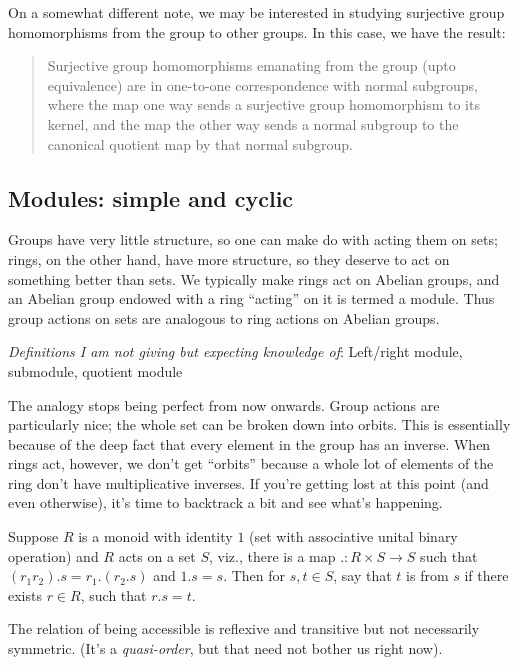 \documentclass[a4paper]{amsart}
\begin{document}
On a somewhat different note, we may be interested in studying
surjective group homomorphisms from the group to other groups. In this
case, we have the result:

\begin{quote}
  Surjective group homomorphisms emanating from the group (upto
  equivalence) are in one-to-one correspondence with normal subgroups,
  where the map one way sends a surjective group homomorphism to its
  kernel, and the map the other way sends a normal subgroup to the
  canonical quotient map by that normal subgroup.
\end{quote}

\subsection{Modules: simple and cyclic}

Groups have very little structure, so one can make do with acting them
on sets; rings, on the other hand, have more structure, so they
deserve to act on something better than sets. We typically
make rings act on Abelian groups, and an Abelian group endowed with a
ring ``acting'' on it is termed a module. Thus group actions on sets
are analogous to ring actions on Abelian groups.

{\em Definitions I am not giving but expecting knowledge of}:
Left/right module, submodule, quotient module
 
The analogy stops being perfect from now onwards. Group actions are
particularly nice; the whole set can be broken down into orbits. This
is essentially because of the deep fact that every element in the
group has an inverse. When rings act, however, we don't get ``orbits''
because a whole lot of elements of the ring don't have multiplicative
inverses. If you're getting lost at this point (and even otherwise),
it's time to backtrack a bit and see what's happening.

\begin{definer}[Accessibility]
  Suppose $R$ is a monoid with identity $1$ (set with associative
  unital binary operation) and $R$ acts on a set $S$, viz., there is a
  map $. : R \times S \to S$ such that $(r_1r_2).s = r_1.(r_2.s)$ and
  $1.s = s$. Then for $s, t \in S$, say that $t$ is
   from $s$ if there exists $r \in R$, such
  that $r.s = t$.
\end{definer}

\begin{claimer}
  The relation of being accessible is reflexive and transitive but not
  necessarily symmetric. (It's a {\em quasi-order}, but that need not
  bother us right now).
\end{claimer}
\end{document}
